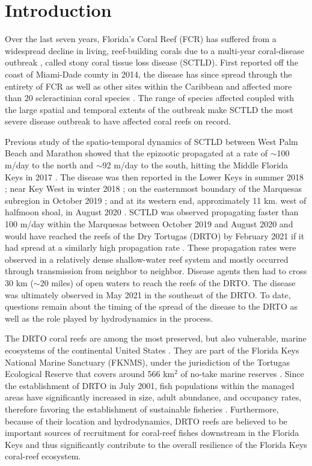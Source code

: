 \section{Introduction}
Over the last seven years, Florida's Coral Reef (FCR) has suffered from a widespread decline in living, reef-building corals due to a multi-year coral-disease outbreak \citep{precht2016unprecedented,walton2018impacts}, called stony coral tissue loss disease (SCTLD). First reported off the coast of Miami-Dade county in 2014, the disease has since spread through the entirety of FCR as well as other sites within the Caribbean \citep{alvarez2019rapid,kramer2019map,estrada2020reef} and affected more than 20 scleractinian coral species \citep{noaa2018}. The range of species affected coupled with the large spatial and temporal extents of the outbreak make SCTLD the most severe disease outbreak to have affected coral reefs on record.

Previous study of the spatio-temporal dynamics of SCTLD between West Palm Beach and Marathon showed that the epizootic propagated at a rate of $\sim$100 m/day to the north and $\sim$92 m/day to the south, hitting the Middle Florida Keys in 2017 \citep{muller2020spatial}. The disease was then reported in the Lower Keys in summer 2018 \citep{frrp2018}; near Key West in winter 2018 \citep{frrp2018}; on the easternmost boundary of the Marquesas subregion in October 2019 \citep{frrp2019}; and at its western end, approximately 11 km. west of halfmoon shoal, in August 2020 \citep{frrp2020}. SCTLD was observed propagating faster than 100 m/day within the Marquesas between October 2019 and August 2020 and would have reached the reefs of the Dry Tortugas (DRTO) by February 2021 if it had spread at a similarly high propagation rate \citep{kramer2019map}. These propagation rates were observed in a relatively dense shallow-water reef system and mostly occurred through transmission from neighbor to neighbor. Disease agents then had to cross 30 km ($\sim$20 miles) of open waters to reach the reefs of the DRTO. The disease was ultimately observed in May 2021 \citep{kramer2019map} in the southeast of the DRTO. To date, questions remain about the timing of the spread of the disease to the DRTO as well as the role played by hydrodynamics in the process.

The DRTO coral reefs are among the most preserved, but also vulnerable, marine ecosystems of the continental United States \citep{kourafalou2018physical}. They are part of the Florida Keys National Marine Sanctuary (FKNMS), under the jurisdiction of the Tortugas Ecological Reserve that covers around 566 km$^2$ of no-take marine reserves \citep{ault2006building}. Since the establishment of DRTO in July 2001, fish populations within the managed areas have significantly increased in size, adult abundance, and occupancy rates, therefore favoring the establishment of sustainable fisheries \citep{ault2013assessing}. Furthermore, because of their location and hydrodynamics, DRTO reefs are believed to be important sources of recruitment for coral-reef fishes downstream in the Florida Keys \citep{domeier2004potential} and thus significantly contribute to the overall resilience of the Florida Keys coral-reef ecosystem.

